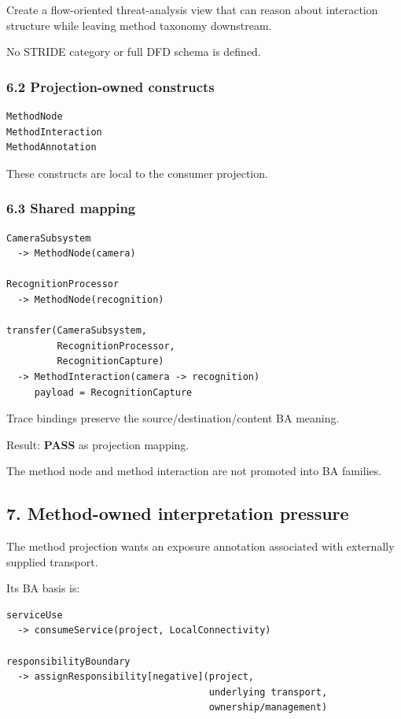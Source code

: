 \documentclass[11pt,a4paper]{article}
\begin{document}
Create a flow-oriented threat-analysis view that can reason about interaction structure while leaving method taxonomy downstream.

No STRIDE category or full DFD schema is defined.

\subsubsection{6.2 Projection-owned constructs}\label{62-projection-owned-constructs}

\begin{verbatim}
MethodNode
MethodInteraction
MethodAnnotation
\end{verbatim}

These constructs are local to the consumer projection.

\subsubsection{6.3 Shared mapping}\label{63-shared-mapping}

\begin{verbatim}
CameraSubsystem
  -> MethodNode(camera)

RecognitionProcessor
  -> MethodNode(recognition)

transfer(CameraSubsystem,
         RecognitionProcessor,
         RecognitionCapture)
  -> MethodInteraction(camera -> recognition)
     payload = RecognitionCapture
\end{verbatim}

Trace bindings preserve the source/destination/content BA meaning.

Result: \textbf{PASS} as projection mapping.

The method node and method interaction are not promoted into BA families.

\subsection{7. Method-owned interpretation pressure}\label{7-method-owned-interpretation-pressure}

The method projection wants an exposure annotation associated with externally supplied transport.

Its BA basis is:

\begin{verbatim}
serviceUse
  -> consumeService(project, LocalConnectivity)

responsibilityBoundary
  -> assignResponsibility[negative](project,
                                    underlying transport,
                                    ownership/management)
\end{verbatim}
\end{document}
